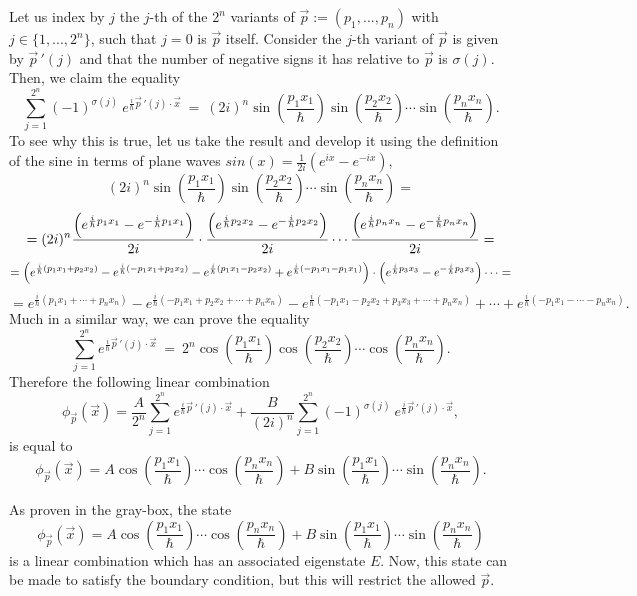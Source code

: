 \documentclass[11pt, a4paper]{article} %
\DeclareRobustCommand{\mybox}[2][gray!10]{%
\begin{tcolorbox}[   %
        left=0.2cm,
        right=0.2cm,
        top=0.15cm,
        bottom=0.15cm,
        colback=#1,
        colframe=#1,
        width=\dimexpr\textwidth\relax, 
        enlarge left by=0mm,
        boxsep=5pt,
        arc=0pt,outer arc=0pt,
        ]
        #2
\end{tcolorbox}
}
\begin{document}
\mybox{
Let us index by $j$ the $j$-th of the $2^n$ variants of $\vec{p}:=(p_1,...,p_n)$ with $j\in\{1,...,2^n\}$, such that $j=0$ is $\vec{p}$ itself. Consider the $j$-th variant of $\vec{p}$ is given by $\vec{p}\,'(j)$ and that the number of negative signs it has relative to $\vec{p}$ is $\sigma(j)$. Then, we claim the equality
\begin{equation}
\sum_{j=1}^{2^n} (-1)^{\sigma(j)}\ e^{\frac{i}{\hbar}\vec{p}\,'(j)\cdot\vec{x}}\ =\ (2i)^n \sin(\frac{p_1x_1}{\hbar})\sin(\frac{p_2x_2}{\hbar})\cdots \sin(\frac{p_nx_n}{\hbar}).
\end{equation}
To see why this is true, let us take the result and develop it using the definition of the sine in terms of plane waves $sin(x)=\frac{1}{2i}(e^{ix}-e^{-ix})$,
\begin{equation}
(2i)^n \sin(\frac{p_1x_1}{\hbar})\sin(\frac{p_2x_2}{\hbar})\cdots \sin(\frac{p_nx_n}{\hbar})=
\end{equation}
$$
=(2i)^n \frac{\qty(e^{\frac{i}{\hbar}p_1x_1}-e^{-\frac{i}{\hbar}p_1x_1})}{2i}\cdot \frac{\qty(e^{\frac{i}{\hbar}p_2x_2}-e^{-\frac{i}{\hbar}p_2x_2})}{2i}\cdots \frac{\qty(e^{\frac{i}{\hbar}p_nx_n}-e^{-\frac{i}{\hbar}p_nx_n})}{2i}=
$$
$$
=\qty(e^{\frac{i}{\hbar}(p_1x_1+p_2x_2)}-e^{\frac{i}{\hbar}(-p_1x_1+p_2x_2)} -e^{\frac{i}{\hbar}(p_1x_1-p_2x_2)}+e^{\frac{i}{\hbar}(-p_1x_1-p_1x_1)})\cdot\qty(e^{\frac{i}{\hbar}p_3x_3}-e^{-\frac{i}{\hbar}p_3x_3})\cdots =
$$
$$
=e^{\frac{i}{\hbar}(p_1x_1+\cdots+p_nx_n)}-e^{\frac{i}{\hbar}(-p_1x_1+p_2x_2+\cdots+p_nx_n)}-e^{\frac{i}{\hbar}(-p_1x_1-p_2x_2+p_3x_3+\cdots+p_nx_n)}+\cdots +e^{\frac{i}{\hbar}(-p_1x_1-\cdots-p_nx_n)}.
$$
Much in a similar way, we can prove the equality
\begin{equation}
\sum_{j=1}^{2^n} e^{\frac{i}{\hbar}\vec{p}\,'(j)\cdot\vec{x}}\ =\ 2^n \cos(\frac{p_1x_1}{\hbar})\cos(\frac{p_2x_2}{\hbar})\cdots \cos(\frac{p_nx_n}{\hbar}).
\end{equation}
Therefore the following linear combination
\begin{equation}
\phi_{\vec{p}}(\vec{x})=\frac{A}{2^n}\sum_{j=1}^{2^n} e^{\frac{i}{\hbar}\vec{p}\,'(j)\cdot\vec{x}}+\frac{B}{(2i)^n}\sum_{j=1}^{2^n} (-1)^{\sigma(j)}\ e^{\frac{i}{\hbar}\vec{p}\,'(j)\cdot\vec{x}},
\end{equation}
is equal to 
\begin{equation}
\phi_{\vec{p}}(\vec{x})= A\cos(\frac{p_1x_1}{\hbar})\cdots \cos(\frac{p_nx_n}{\hbar})+B\sin(\frac{p_1x_1}{\hbar})\cdots \sin(\frac{p_nx_n}{\hbar}).
\end{equation}
}
As proven in the gray-box, the state 
\begin{equation}
\phi_{\vec{p}}(\vec{x})= A\cos(\frac{p_1x_1}{\hbar})\cdots \cos(\frac{p_nx_n}{\hbar})+B\sin(\frac{p_1x_1}{\hbar})\cdots \sin(\frac{p_nx_n}{\hbar})
\end{equation}
is a linear combination which has an associated eigenstate $E$. Now, this state can be made to satisfy the boundary condition, but this will restrict the allowed $\vec{p}$. 
\end{document}
